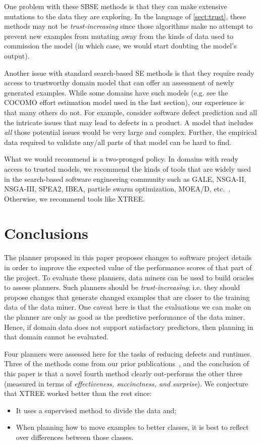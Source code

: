 \documentclass{sig-alternate}
\newcommand{\bi}{\begin{itemize}}
\newcommand{\ei}{\end{itemize}}
\newcommand{\tion}[1]{\textsection\ref{sect:#1}}
\begin{document}
One problem with these   SBSE methods is that they can  make extensive mutations to the data they are exploring. In the language
of \tion{trust}, these methods may not be {\em trust-increasing} since those algorithms make no attempt
to prevent new examples from mutating away from the kinds of data used to commission the model (in which case, we would
start doubting the model's output).

Another issue with standard search-based SE methods is that they require ready access to 
trustworthy domain model that can offer an assessment
of newly generated examples. While some domains have such models (e.g. see the COCOMO effort estimation model
used in the last section), our experience is that many others do not.  For example, 
consider software defect prediction and all the intricate issues that may lead to defects in a product. A model that includes {\em all} those
potential issues would be very large and complex. Further,
the empirical data required to validate any/all parts
of that model can be hard to find.

What we would recommend is a two-pronged policy.
In domains with ready access to trusted models, we recommend
the kinds of tools that are widely used in the search-based
software engineering community such as GALE, NSGA-II, NSGA-III, SPEA2, IBEA, particle swarm optimization, MOEA/D, etc.~\cite{krall14,deb00a,zit02,zit04,%
deb14,Cui2005a,zhang07:TEC}. Otherwise, we recommend tools like XTREE.

\section{Conclusions}

The planner proposed in this paper proposes changes to software project details in order to improve the expected
value of the performance scores of that part of the project.
To evaluate these planners,
data miners can be used to build oracles to assess planners.
Such planners should be {\em trust-increasing}; i.e. they should propose changes that generate
changed examples that are closer to the training data of the data miner.
One caveat here is that the evaluations we can make on the planner are only as good as the predictive
performance of the data miner. Hence, if domain data does not support satisfactory predictors, then
planning in that domain cannot be evaluated.

Four planners were assessed here for the tasks of reducing defects and runtimes. 
Three of the methods come from our prior publications~\cite{me12c,krishna15}, and the conclusion of this
paper is that a novel fourth method clearly out-performs the other three
(measured in terms of {\em effectiveness, succinctness, and surprise}).
We conjecture that XTREE worked better than the rest since:
\bi
\item
It uses a supervised method to divide the data and;
\item
When planning how to move examples to better classes, it is best to reflect over 
differences between those classes.
\ei
\end{document}
